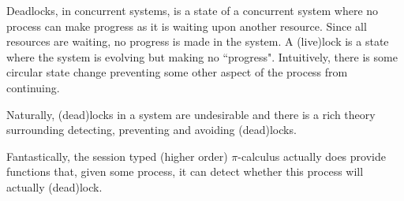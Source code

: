 Deadlocks, in concurrent systems, is a state of a concurrent system where no process can make progress as it is waiting upon another resource. Since all resources are waiting, no progress is made in the system. A (live)lock is a state where the system is evolving but making no ``progress". Intuitively, there is some circular state change preventing some other aspect of the process from continuing.

Naturally, (dead)locks in a system are undesirable and there is a rich theory  surrounding detecting, preventing and avoiding (dead)locks.

Fantastically, the session typed (higher order) $\pi$-calculus actually does provide functions that, given some process, it can detect whether this process will actually (dead)lock. 


